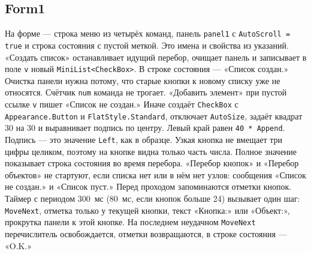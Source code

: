 \documentclass[a4paper,14pt]{extarticle}
\begin{document}
\subsection{Form1}
На форме — строка меню из четырёх команд, панель \texttt{panel1} с \texttt{AutoScroll = true} и строка состояния с пустой меткой. Это имена и свойства из указаний.
«Создать список» останавливает идущий перебор, очищает панель и записывает в поле \texttt{v} новый \texttt{MiniList<CheckBox>}. В строке состояния — «Список создан.» Очистка панели нужна потому, что старые кнопки к новому списку уже не относятся. Счётчик \texttt{num} команда не трогает.
«Добавить элемент» при пустой ссылке \texttt{v} пишет «Список не создан.» Иначе создаёт \texttt{CheckBox} с \texttt{Appearance.Button} и \texttt{FlatStyle.Standard}, отключает \texttt{AutoSize}, задаёт квадрат 30 на 30 и выравнивает подпись по центру. Левый край равен \texttt{40 * Append}. Подпись — это значение \texttt{Left}, как в образце. Узкая кнопка не вмещает три цифры целиком, поэтому на кнопке видна только часть числа. Полное значение показывает строка состояния во время перебора.
«Перебор кнопок» и «Перебор объектов» не стартуют, если списка нет или в нём нет узлов: сообщения «Список не создан.» и «Список пуст.» Перед проходом запоминаются отметки кнопок. Таймер с периодом 300~мс (80~мс, если кнопок больше 24) вызывает один шаг: \texttt{MoveNext}, отметка только у текущей кнопки, текст «Кнопка:» или «Объект:», прокрутка панели к этой кнопке. На последнем неудачном \texttt{MoveNext} перечислитель освобождается, отметки возвращаются, в строке состояния — «O.K.»
\end{document}
